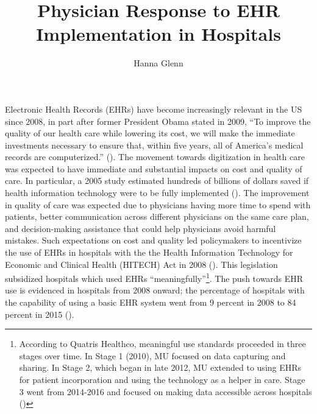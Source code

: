 \documentclass[11pt]{article}
\title{Physician Response to EHR Implementation in Hospitals}
\author{Hanna Glenn}
\begin{document}
\maketitle



\vspace{1.5cm}

Electronic Health Records (EHRs) have become increasingly relevant in the US since 2008, in part after former President Obama stated in 2009, “To improve the quality of our health care while lowering its cost, we will make the immediate investments necessary to ensure that, within five years, all of America’s medical records are computerized.” (\cite{presquote}). The movement towards digitization in health care was expected to have immediate and substantial impacts on cost and quality of care. In particular, a 2005 study estimated hundreds of billions of dollars saved if health information technology were to be fully implemented (\cite{hillestad2005}). The improvement in quality of care was expected due to physicians having more time to spend with patients, better communication across different physicians on the same care plan, and decision-making assistance that could help physicians avoid harmful mistakes. Such expectations on cost and quality led policymakers to incentivize the use of EHRs in hospitals with the the Health Information Technology for Economic and Clinical Health (HITECH) Act in 2008 (\cite{hitech}). This legislation subsidized hospitals which used EHRs “meaningfully”\footnote{According to Quatris Healthco, meaningful use standards proceeded in three stages over time. In Stage 1 (2010), MU focused on data capturing and sharing. In Stage 2, which began in late 2012, MU extended to using EHRs for patient incorporation and using the technology as a helper in care. Stage 3 went from 2014-2016 and focused on making data accessible across hospitals (\cite{meanuse})}. The push towards EHR use is evidenced in hospitals from 2008 onward; the percentage of hospitals with the capability of using a basic EHR system went from 9 percent in 2008 to 84 percent in 2015 (\cite{stats}).
\end{document}
